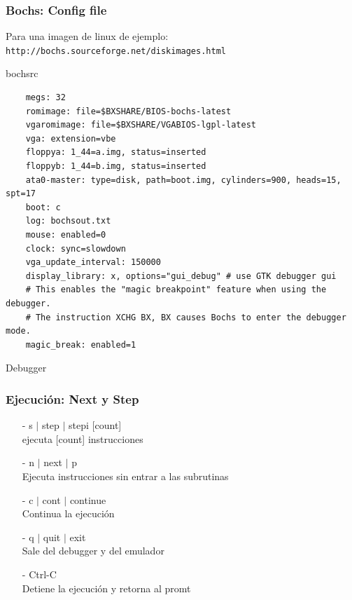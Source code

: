 \documentclass[aspectratio=169]{beamer}
\begin{document}
\begin{frame}[fragile]
    \frametitle{Bochs: Config file}
    Para una imagen de linux de ejemplo:
    \small \texttt{http://bochs.sourceforge.net/diskimages.html}
    \scriptsize
    \begin{block}{bochsrc}
    \vspace{-0.3cm}
    \begin{verbatim}
    megs: 32
    romimage: file=$BXSHARE/BIOS-bochs-latest
    vgaromimage: file=$BXSHARE/VGABIOS-lgpl-latest
    vga: extension=vbe
    floppya: 1_44=a.img, status=inserted
    floppyb: 1_44=b.img, status=inserted
    ata0-master: type=disk, path=boot.img, cylinders=900, heads=15, spt=17
    boot: c
    log: bochsout.txt
    mouse: enabled=0
    clock: sync=slowdown
    vga_update_interval: 150000
    display_library: x, options="gui_debug" # use GTK debugger gui
    # This enables the "magic breakpoint" feature when using the debugger.
    # The instruction XCHG BX, BX causes Bochs to enter the debugger mode.
    magic_break: enabled=1
    \end{verbatim}
    \vspace{-0.5cm}
    \end{block}
\end{frame}

\begin{frame}
    \Huge Debugger
\end{frame}

\begin{frame}
    \frametitle{Ejecución: Next y Step}
    \normalsize
    \vspace{0.5cm}
    \begin{itemize}
    \item[-] s $|$ step $|$ stepi [count] \\
    \textcolor{verdeuca}{ejecuta [count] instrucciones} %
    \vspace{0.2cm}
    \item[-] n $|$ next $|$ p \\
    \textcolor{verdeuca}{Ejecuta instrucciones sin entrar a las subrutinas} %
    \vspace{0.2cm}
    \item[-] c $|$ cont $|$ continue \\
    \textcolor{verdeuca}{Continua la ejecución} %
    \vspace{0.2cm}
    \item[-] q $|$ quit $|$ exit \\
    \textcolor{verdeuca}{Sale del debugger y del emulador} %
    \vspace{0.2cm}
    \item[-] Ctrl-C \\
    \textcolor{verdeuca}{Detiene la ejecución y retorna al promt} %
    \end{itemize}
\end{frame}
\end{document}
